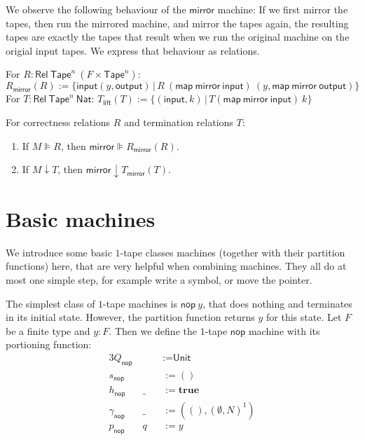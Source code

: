 \documentclass{psartcl}
\newcommand{\MS}[1]{\textsf{#1}}
\newcommand{\setOf}[1]{\bigl \{ #1 \bigr \}}
\newcommand{\setMap}[2]{\setOf{#1 \,\big|\, #2}}
\newcommand{\Nat}{\MS{Nat}}
\newcommand{\Unit}{\MS{Unit}}
\renewcommand{\None}{\emptyset}
\newcommand{\true}{\mathbf{true}}
\newcommand{\unit}{\mathbf{()}}
\newcommand{\Rel}{\mathsf{Rel}}
\newcommand{\Tape}{\MS{Tape}}
\newcommand{\Tapes}[1]{\Tape^{#1}}
\newcommand{\map}{\ensuremath{\MS{map}}}
\begin{document}
We observe the following behaviour of the $\MS{mirror}$ machine:  If we first mirror the tapes, then run the mirrored machine, and mirror the tapes
again, the resulting tapes are exactly the tapes that result when we run the original machine on the origial input tapes.
We express that behaviour as relations.
\begin{definition}
  \label{def:mirror-rellift}
  For $R : \Rel~\Tapes{n}~(F \times \Tapes{n})$:
  $$R_\MS{mirror}(R) := \setMap{\MS{input} (y, \MS{output})}{R~(\map~\MS{mirror}~\MS{input})~(y, \map~\MS{mirror}~\MS{output})}$$
  For $T : \Rel~\Tapes{n}~\Nat$:
  $T_\MS{lift}(T) := \setMap{(\MS{input}, k)}{T (\map~\MS{mirror}~\MS{input})~k}$
\end{definition}
\begin{lemma}[Correctness of $\MS{mirror}$]
  \label{lem:sigma-tau}
  For correctness relations $R$ and termination relations $T$:
  \begin{enumerate}
    \item
      If $M \VDash R$, then $\MS{mirror} \VDash R_{\MS{mirror}}(R)$.
    \item
      If $M \downarrow T$, then $\MS{mirror} \downarrow T_{\MS{mirror}}(T)$.
  \end{enumerate}
\end{lemma}

\section{Basic machines}


We introduce some basic $1$-tape classes machines (together with their partition functions) here, that are very helpful when combining machines.
They all do at most one simple step, for example write a symbol, or move the pointer.

The simplest class of $1$-tape machines is $\MS{nop}~y$, that does nothing and terminates in its initial state.  However, the partition function
returns $y$ for this state.
Let $F$ be a finite type and $y : F$.
Then we define the $1$-tape $\MS{nop}$ machine with its portioning function:
\begin{alignat*}{3}
  Q_     \MS{nop} &~  &&:= \Unit \\
  s_     \MS{nop} &~  &&:= \unit \\
  h_     \MS{nop} &~\_&&:= \true \\
  \gamma_\MS{nop} &~\_&&:= (\unit, (\None, N)^1) \\
  p_     \MS{nop} &~q &&:= y
\end{alignat*}
\end{document}
